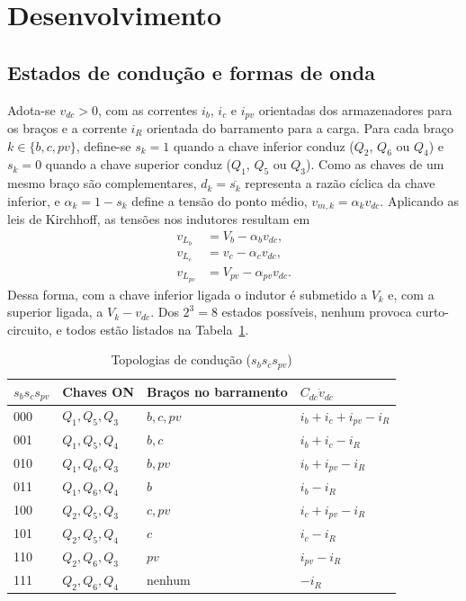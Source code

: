 \section{Desenvolvimento}

\subsection{Estados de condução e formas de onda}

Adota-se $v_{dc}>0$, com as correntes $i_b$, $i_c$ e $i_{pv}$ orientadas dos armazenadores para os braços e a corrente $i_R$ orientada do barramento para a carga. Para cada braço $k\in\{b,c,pv\}$, define-se $s_k=1$ quando a chave inferior conduz ($Q_2$, $Q_6$ ou $Q_4$) e $s_k=0$ quando a chave superior conduz ($Q_1$, $Q_5$ ou $Q_3$). Como as chaves de um mesmo braço são complementares, $d_k=\overline{s_k}$ representa a razão cíclica da chave inferior, e $\alpha_k=1-s_k$ define a tensão do ponto médio, $v_{m,k}=\alpha_k v_{dc}$. Aplicando as leis de Kirchhoff, as tensões nos indutores resultam em
\begin{align}
v_{L_b}&=V_b-\alpha_b v_{dc},\nonumber\\
v_{L_c}&=v_c-\alpha_c v_{dc},\label{eq:vL}\\
v_{L_{pv}}&=V_{pv}-\alpha_{pv} v_{dc}.\nonumber
\end{align}
Dessa forma, com a chave inferior ligada o indutor é submetido a $V_k$ e, com a superior ligada, a $V_k-v_{dc}$. Dos $2^3=8$ estados possíveis, nenhum provoca curto-circuito, e todos estão listados na Tabela~\ref{tab:estados}.

\begin{table}[H]
\centering
\caption{Topologias de condução ($s_bs_cs_{pv}$)}
\label{tab:estados}
\footnotesize
\setlength{\tabcolsep}{3pt}
\begin{tabular}{llll}
\toprule
$s_bs_cs_{pv}$ & Chaves ON & Braços no barramento & $C_{dc}\dot v_{dc}$ \\
\midrule
000 & $Q_1,Q_5,Q_3$ & $b,c,pv$ & $i_b+i_c+i_{pv}-i_R$ \\
001 & $Q_1,Q_5,Q_4$ & $b,c$ & $i_b+i_c-i_R$ \\
010 & $Q_1,Q_6,Q_3$ & $b,pv$ & $i_b+i_{pv}-i_R$ \\
011 & $Q_1,Q_6,Q_4$ & $b$ & $i_b-i_R$ \\
100 & $Q_2,Q_5,Q_3$ & $c,pv$ & $i_c+i_{pv}-i_R$ \\
101 & $Q_2,Q_5,Q_4$ & $c$ & $i_c-i_R$ \\
110 & $Q_2,Q_6,Q_3$ & $pv$ & $i_{pv}-i_R$ \\
111 & $Q_2,Q_6,Q_4$ & nenhum & $-i_R$ \\
\bottomrule
\end{tabular}
\end{table}

